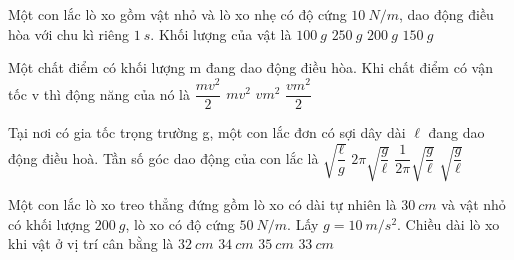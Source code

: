 	\begin{ex} %
		Một con lắc lò xo gồm vật nhỏ và lò xo nhẹ có độ cứng $10\ N/m$, dao động điều hòa với chu kì riêng $1\ s$. Khối lượng của vật là
		\choice
		{$100\ g$}
		{\True $250\ g$}
		{$200\ g$}
		{$150\ g$}
		
	\end{ex}
	\begin{ex} %
		Một chất điểm có khối lượng m đang dao động điều hòa. Khi chất điểm có vận tốc v thì động năng của nó là
		\choice
		{\True $\dfrac{m{v}^{2}}{2}$}
		{$mv^{2}$}
		{$vm^{2}$}
		{$\dfrac{v{m}^{2}}{2}$}
	\end{ex}
	\begin{ex}%
		Tại nơi có gia tốc trọng trường g, một con lắc đơn có sợi dây dài $\ell$ đang dao động điều hoà. Tần số góc dao động của con lắc là
		\choice
		{$\sqrt{\dfrac{\ell}{g}}$}
		{$2\pi \sqrt{\dfrac{g}{\ell}}$}
		{$\dfrac{1}{2\pi}\sqrt{\dfrac{g}{\ell}}$}
		{\True $\sqrt{\dfrac{g}{\ell}}$}
	\end{ex}
	
	\begin{ex}%
		Một con lắc lò xo treo thẳng đứng gồm lò xo có dài tự nhiên là $30\ cm$ và vật nhỏ có khối lượng $200\ g$, lò xo có độ cứng $50\ N/m$. Lấy $g = 10\ m/s^2$. Chiều dài lò xo khi vật ở vị trí cân bằng là
		\choice
		{$32\ cm$}
		{\True $34\ cm$}
		{$35\ cm$}
		{$33\ cm$}
	\end{ex}
	

